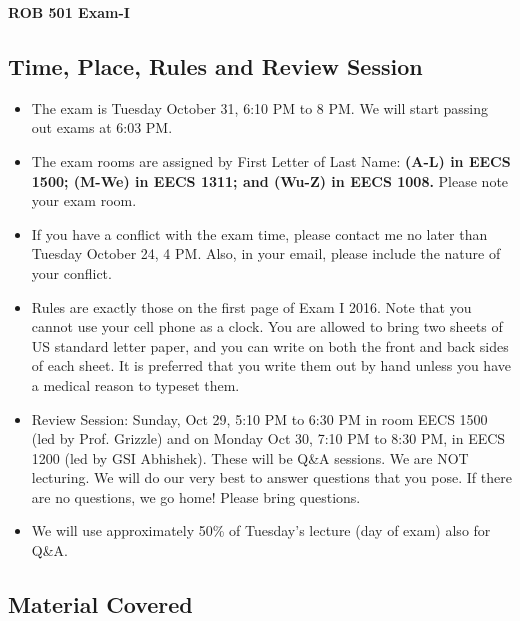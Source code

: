 \documentclass[letterpaper]{article}
\begin{document}
\vspace*{.1in}
\begin{center}
\LARGE \bf
ROB 501 Exam-I \\
\end{center}

\vspace*{1cm}

\subsection*{Time, Place, Rules and Review Session}

\begin{itemize}
\item The exam is Tuesday October 31, 6:10 PM to 8 PM. We will start passing out exams at 6:03 PM.
\item The exam rooms are assigned by First Letter of Last Name: \textbf{(A-L) in EECS 1500; (M-We) in EECS 1311; and (Wu-Z) in EECS 1008.} Please note your exam room.
\item If you have a conflict with the exam time, please contact me no later than Tuesday October 24, 4 PM. Also, in your email, please include the nature of your conflict.
\item Rules are exactly those on the first page of Exam I 2016. Note that you cannot use your cell phone as a clock. You are allowed to bring two sheets of US standard letter paper, and you can write on both the front and back sides of each sheet. It is preferred that you write them out by hand unless you have a medical reason to typeset them.
\item Review Session: Sunday, Oct 29, 5:10 PM to 6:30 PM in room EECS 1500 (led by Prof. Grizzle) and on Monday Oct 30, 7:10 PM to 8:30 PM, in EECS 1200 (led by GSI Abhishek). These will be Q\&A sessions. We are NOT lecturing. We will do our very best to answer questions that you pose. If there are no questions, we go home! Please bring questions.
    \item We will use approximately 50\% of Tuesday's lecture (day of exam) also for Q\&A.
\end{itemize}

\subsection*{Material Covered}
\end{document}
